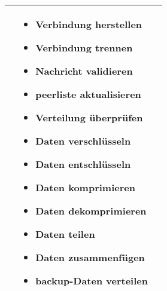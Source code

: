 {\begin{center}
\begin{tabular}{|l|l|l|}
                 \vspace{0.1cm}
               & \begin{minipage}{10cm}
					\vspace{0.1cm}
					\begin{itemize}
						\item Verbindung herstellen
						\item Verbindung trennen
						\item Nachricht validieren
						\item \gls{peerliste} aktualisieren
						\item Verteilung überprüfen
						\item Daten verschlüsseln
						\item Daten entschlüsseln
						\item Daten komprimieren
						\item Daten dekomprimieren
						\item Daten teilen
						\item Daten zusammenfügen
						\item \gls{backup}-Daten verteilen
					\end{itemize}
                    \vspace{0.1cm}
                    \end{minipage}\\[0.1cm]
	\hline
	\end{tabular}

\end{center}}
